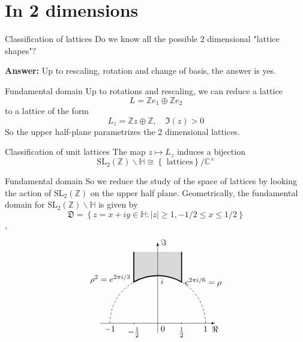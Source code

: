 \documentclass[pdf]{beamer}
\begin{document}
\section{In 2 dimensions}
\begin{frame}{Classification of lattices}
    Do we know all the possible 2 dimensional "lattice shapes"?\vspace{3em}

    \pause
    \textbf{Answer:} Up to rescaling, rotation and change of basis, the answer is yes.
\end{frame}
\begin{frame}{Fundamental domain}
    Up to rotations and rescaling, we can reduce a lattice
    \[L = \mathbb{Z}e_1 \oplus \mathbb{Z}e_2\]
    to a lattice of the form
    \[L_z = \mathbb{Z}z\oplus\mathbb{Z}, \quad \Im(z)>0\]
    So the upper half-plane parametrizes the 2 dimensional lattices.
    \begin{block}{Classification of unit lattices}
        The map $z \mapsto L_z$ induces a bijection
        \[\text{SL}_2(\mathbb{Z}) \backslash\mathbb{H} \cong \left\lbrace \text{ lattices}\right\rbrace/\mathbb{C^\times}\]
    \end{block}

\end{frame}
\begin{frame}{Fundamental domain}
    So we reduce the study of the space of lattices by looking the action of $\text{SL}_2(\mathbb{Z})$ on the upper half plane. Geometrically, the fundamental domain for $\text{SL}_2(\mathbb{Z}) \backslash \mathbb{H}$ is given by
    \[\mathfrak{D} = \left\lbrace z=x+iy \in \mathbb{H}: |z| \ge 1,-1/2 \le x \le 1/2 \right\rbrace \],
    \pause
    \[
        \begin{tikzpicture}[scale=2]
            \draw[densely dashed] (1,0) arc (0:60:1) (-1,0) arc (180:120:1);
            \draw[very thick, fill=gray!30] (.5,1.5) --node[right, pos=1]{$e^{2\pi i/6}=\rho$} (60:1) arc (60:120:1)
            --node[left, pos=.1]{$\rho^2=e^{2\pi i/3}$} (-.5,1.5);
            \draw[-latex] (-1.2,0) -- (1.2,0)node[below]{$\Re$};
            \draw[-latex] (0,-.2) -- (0,1.7)node[right]{$\Im$};
            \path(-1,0) --node[below, pos=0]{$-1$}node[below right, pos=.5]{0}node[below, pos=1]{1} (1,0)
            (0,1)node[below right]{$i$};
            \draw(-.5,.02)--(-.5,-.02)node[below]{$-\frac{1}{2}$}(.5,.02)--(.5,-.02)node[below]{$\frac{1}{2}$};
        \end{tikzpicture}\]
\end{frame}
\end{document}
